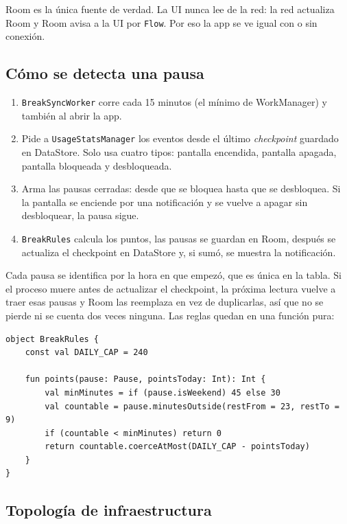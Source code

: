 Room es la única fuente de verdad. La UI nunca lee de la red: la red actualiza Room y Room avisa a la UI por \texttt{Flow}. Por eso la app se ve igual con o sin conexión.

\subsection{Cómo se detecta una pausa}

\begin{enumerate}
\item \texttt{BreakSyncWorker} corre cada 15 minutos (el mínimo de WorkManager) y también al abrir la app.
\item Pide a \texttt{UsageStatsManager} los eventos desde el último \textit{checkpoint} guardado en DataStore. Solo usa cuatro tipos: pantalla encendida, pantalla apagada, pantalla bloqueada y desbloqueada.
\item Arma las pausas cerradas: desde que se bloquea hasta que se desbloquea. Si la pantalla se enciende por una notificación y se vuelve a apagar sin desbloquear, la pausa sigue.
\item \texttt{BreakRules} calcula los puntos, las pausas se guardan en Room, después se actualiza el checkpoint en DataStore y, si sumó, se muestra la notificación.
\end{enumerate}

Cada pausa se identifica por la hora en que empezó, que es única en la tabla. Si el proceso muere antes de actualizar el checkpoint, la próxima lectura vuelve a traer esas pausas y Room las reemplaza en vez de duplicarlas, así que no se pierde ni se cuenta dos veces ninguna. Las reglas quedan en una función pura:

\noindent\begin{minipage}{\linewidth}
\begin{lstlisting}
object BreakRules {
    const val DAILY_CAP = 240

    fun points(pause: Pause, pointsToday: Int): Int {
        val minMinutes = if (pause.isWeekend) 45 else 30
        val countable = pause.minutesOutside(restFrom = 23, restTo = 9)
        if (countable < minMinutes) return 0
        return countable.coerceAtMost(DAILY_CAP - pointsToday)
    }
}
\end{lstlisting}
\end{minipage}

\subsection{Topología de infraestructura}

